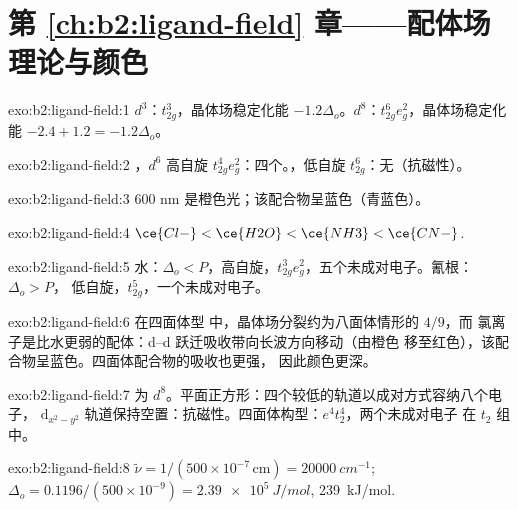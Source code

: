 \section*{第 \ref{ch:b2:ligand-field} 章——配体场理论与颜色}

\begin{solution}{exo:b2:ligand-field:1}
$d^3$：$t_{2g}^3$，晶体场稳定化能 $-1.2\Delta_o$。$d^8$：$t_{2g}^6e_g^2$，晶体场稳定化能 $-2.4 + 1.2 = -1.2\Delta_o$。
\end{solution}

\begin{solution}{exo:b2:ligand-field:2}
，$d^6$ 高自旋 $t_{2g}^4e_g^2$：四个。，低自旋
$t_{2g}^6$：无（抗磁性）。
\end{solution}

\begin{solution}{exo:b2:ligand-field:3}
600 nm 是橙色光；该配合物呈蓝色（青蓝色）。
\end{solution}

\begin{solution}{exo:b2:ligand-field:4}
$\ce{Cl-} < \ce{H2O} < \ce{NH3} < \ce{CN-}$.
\end{solution}

\begin{solution}{exo:b2:ligand-field:5}
水：$\Delta_o < P$，高自旋，$t_{2g}^3e_g^2$，五个未成对电子。氰根：$\Delta_o > P$，
低自旋，$t_{2g}^5$，一个未成对电子。
\end{solution}

\begin{solution}{exo:b2:ligand-field:6}
在四面体型  中，晶体场分裂约为八面体情形的 $4/9$，而
氯离子是比水更弱的配体：d–d 跃迁吸收带向长波方向移动（由橙色
移至红色），该配合物呈蓝色。四面体配合物的吸收也更强，
因此颜色更深。
\end{solution}

\begin{solution}{exo:b2:ligand-field:7}
 为 $d^8$。平面正方形：四个较低的轨道以成对方式容纳八个电子，
$\mathrm d_{x^2-y^2}$ 轨道保持空置：抗磁性。四面体构型：$e^4t_2^4$，两个未成对电子
在 $t_2$ 组中。
\end{solution}

\begin{solution}{exo:b2:ligand-field:8}
$\tilde\nu = 1/(500 \times 10^{-7}\,\text{cm}) = \qty{20000}{cm^{-1}}$; $\Delta_o =
0.1196/(500 \times 10^{-9}) = \qty{2.39e5}{J/mol}$, \qty{239}{kJ/mol}.
\end{solution}


